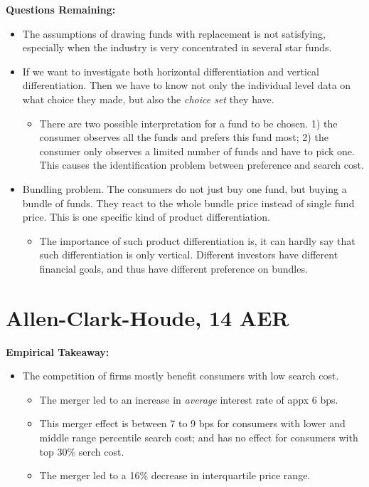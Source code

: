 \documentclass{book}
\theoremstyle{plain}
\theoremstyle{definition}
\begin{document}
\vspace{1em}
\noindent
\textbf{Questions Remaining:}
\begin{itemize}
	\item The assumptions of drawing funds with replacement is not satisfying, especially when the industry is very concentrated in several star funds.
	
	\item If we want to investigate both horizontal differentiation and vertical differentiation. Then we have to know not only the individual level data on what choice they made, but also the \textit{choice set} they have.
	\begin{itemize}
		\item There are two possible interpretation for a fund to be chosen. 1) the consumer observes all the funds and prefers this fund most; 2) the consumer only observes a limited number of funds and have to pick one. This causes the identification problem between preference and search cost.
	\end{itemize}

	\item Bundling problem. The consumers do not just buy one fund, but buying a bundle of funds. They react to the whole bundle price instead of single fund price. This is one specific kind of product differentiation.
	\begin{itemize}
		\item The importance of such product differentiation is, it can hardly say that such differentiation is only vertical. Different investors have different financial goals, and thus have different preference on bundles.
	\end{itemize}
\end{itemize}

\section{Allen-Clark-Houde, 14 AER} %
\label{sec:allen_clark_houde}

\textbf{}

\vspace{1em}
\noindent
\textbf{Empirical Takeaway:}
\begin{itemize}
	\item The competition of firms mostly benefit consumers with low search cost.
	\begin{itemize}
		\item The merger led to an increase in \textit{average} interest rate of appx 6 bps.
		\item This merger effect is between 7 to 9 bps for consumers with lower and middle range percentile search cost; and has no effect for consumers with top 30\% serch cost.
		\item The merger led to a 16\% decrease in interquartile price range.
	\end{itemize}
\end{itemize}
\end{document}
